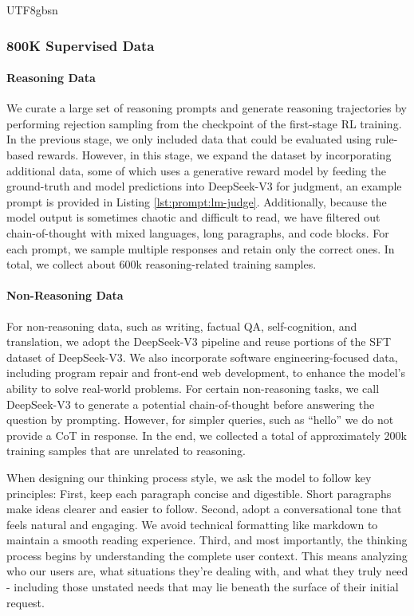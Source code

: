 \documentclass[11pt, a4paper, logo, copyright, nonumbering]{deepseek}
\begin{document}
\begin{CJK*}{UTF8}{gbsn}




\subsubsection{800K Supervised Data} \label{sec:sft_data}
\paragraph{Reasoning Data} 
We curate a large set of reasoning prompts and generate reasoning trajectories by performing rejection sampling from the checkpoint of the first-stage RL training.
In the previous stage, we only included data that could be evaluated using rule-based rewards. However, in this stage, we expand the dataset by incorporating additional data, some of which uses a generative reward model by feeding the ground-truth and model predictions into DeepSeek-V3 for judgment, an example prompt is provided in Listing \ref{lst:prompt:lm-judge}.
Additionally, because the model output is sometimes chaotic and difficult to read, we have filtered out chain-of-thought with mixed languages, long paragraphs, and code blocks.
For each prompt, we sample multiple responses and retain only the correct ones. In total, we collect about 600k reasoning-related training samples. 

\paragraph{Non-Reasoning Data}
For non-reasoning data, such as writing, factual QA, self-cognition, and translation, we adopt the DeepSeek-V3 pipeline and reuse portions of the SFT dataset of DeepSeek-V3. We also incorporate software engineering-focused data, including program repair and front-end web development, to enhance the model's ability to solve real-world problems. For certain non-reasoning tasks, we call DeepSeek-V3 to generate a potential chain-of-thought before answering the question by prompting. However, for simpler queries, such as ``hello'' we do not provide a CoT in response.
In the end, we collected a total of approximately 200k training samples that are unrelated to reasoning.

When designing our thinking process style, we ask the model to follow key principles: First, keep each paragraph concise and digestible. Short paragraphs make ideas clearer and easier to follow. Second, adopt a conversational tone that feels natural and engaging. We avoid technical formatting like markdown to maintain a smooth reading experience. Third, and most importantly, the thinking process begins by understanding the complete user context. This means analyzing who our users are, what situations they're dealing with, and what they truly need - including those unstated needs that may lie beneath the surface of their initial request.


\end{CJK*}
\end{document}
